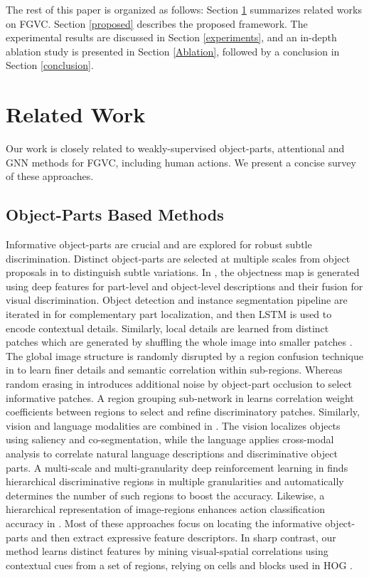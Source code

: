 \documentclass[journal]{IEEEtran}
\begin{document}
The rest of this paper is organized as follows: Section \ref{rel_work} summarizes related works on FGVC. Section \ref{proposed} describes the proposed framework. The experimental results are discussed in Section \ref{experiments}, and an in-depth ablation study is presented in Section \ref{Ablation}, followed by a conclusion in Section \ref{conclusion}.

\section{Related Work} \label{rel_work}
Our work is closely related to weakly-supervised object-parts, attentional and GNN methods for FGVC, including human actions. We present a concise survey of these approaches.
\vspace{ - 0.5 cm}
\subsection {Object-Parts Based Methods} 
Informative object-parts are crucial and are explored \cite{ zhang2016weakly, yao2017autobd, ge2019weakly} for robust subtle discrimination. Distinct object-parts are selected at multiple scales from object proposals in \cite{zhang2016weakly} to distinguish subtle variations. In \cite{yao2017autobd}, the objectness map is generated using deep features for part-level and  object-level descriptions and their fusion for visual discrimination. Object detection and instance segmentation pipeline are iterated in \cite{ge2019weakly} for complementary part localization, and then LSTM is used to encode contextual details. Similarly, local details are learned from distinct patches which are generated by shuffling the whole image into smaller patches \cite{chen2019destruction, zhong2020random,wang2019weakly}. 
The global image structure is randomly disrupted by a region confusion technique in \cite{chen2019destruction} to learn finer  details and semantic correlation within sub-regions. Whereas random erasing in \cite{zhong2020random} introduces additional noise by object-part occlusion to select informative patches. A region grouping sub-network in \cite{wang2019weakly} learns correlation weight coefficients between regions to select and refine discriminatory patches. Similarly, vision and language modalities are combined in \cite{he2017fine2}. The vision localizes objects using saliency and co-segmentation, while the language applies cross-modal analysis to correlate natural language descriptions and discriminative object parts. A multi-scale and multi-granularity deep reinforcement learning in \cite{he2019and} finds hierarchical discriminative regions in multiple granularities and automatically determines the number of such regions to boost the accuracy. Likewise, a hierarchical representation of image-regions enhances  action classification accuracy in \cite{li2018reassessing}. Most of these approaches focus on locating the informative object-parts and then extract expressive feature descriptors. In sharp contrast, our method learns distinct features by mining visual-spatial correlations using contextual cues from a set of regions, relying on cells and blocks used in HOG \cite{behera2020regional}. 
\end{document}
